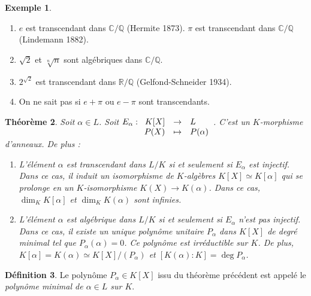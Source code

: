 \documentclass{article}
\newcommand{\Q}{\mathbb{Q}}
\newcommand{\R}{\mathbb{R}}
\newcommand{\C}{\mathbb{C}}
\newcommand{\applic}[4]{\begin{array}[t]{rcl}
#1 & \to & #2 \\
#3 & \mapsto & #4
\end{array}}
\theoremstyle{plain}
\newtheorem{theorem}{Théorème}[section]
\theoremstyle{definition}
\newtheorem{definition}[theorem]{Définition}
\newtheorem{example}[theorem]{Exemple}
\theoremstyle{remark}
\begin{document}
\begin{example} \leavevmode
    \begin{enumerate}
        \item $e$ est transcendant dans $\C/\Q$ (Hermite 1873). $\pi$ est transcendant dans $\C/\Q$ (Lindemann 1882).
        \item $\sqrt{2}$ et $\sqrt[n]{n}$ sont algébriques dans $\C/\Q$.
        \item $2^{\sqrt{2}}$ est transcendant dans $\R/\Q$ (Gelfond-Schneider 1934).
        \item On ne sait pas si $e+\pi$ ou $e-\pi$ sont transcendants.
    \end{enumerate}
\end{example}

\begin{theorem} \label{thmpolmin}
    Soit $\alpha \in L$. Soit $E_\alpha : \applic{K[X]}{L}{P(X)}{P(\alpha)}$. C'est un $K$-morphisme d'anneaux. De plus :
    \begin{enumerate}
        \item L'élément $\alpha$ est transcendant dans $L/K$ si et seulement si $E_\alpha$ est injectif. Dans ce cas, il induit un isomorphisme de $K$-algèbres $K[X] \simeq K[\alpha]$ qui se prolonge en un $K$-isomorphisme $K(X) \to K(\alpha)$. Dans ce cas, $\dim_K K[\alpha]$ et $\dim_K K(\alpha)$ sont infinies.
        \item L'élément $\alpha$ est algébrique dans $L/K$ si et seulement si $E_\alpha$ n'est pas injectif. Dans ce cas, il existe un unique polynôme unitaire $P_\alpha$ dans $K[X]$ de degré minimal tel que $P_\alpha (\alpha) = 0$. Ce polynôme est irréductible sur $K$. De plus, $K[\alpha] = K(\alpha) \simeq K[X]/(P_\alpha)$ et $[K(\alpha) : K] = \deg P_\alpha$.
    \end{enumerate}
\end{theorem}

\begin{definition}
    Le polynôme $P_\alpha \in K[X]$ issu du théorème précédent est appelé le \emph{polynôme minimal de $\alpha \in L$ sur $K$}.
\end{definition}
\end{document}
